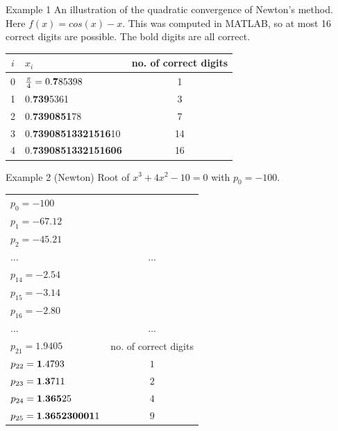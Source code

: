 \documentclass[12pt]{beamer}
\begin{document}
\begin{frame}{Example 1} 
An illustration of the quadratic convergence of Newton's method. Here $f(x) = cos(x) -x$. This was computed in MATLAB, so at most 16 correct digits are possible. The bold digits are all correct. 


\begin{table}[h] 
\begin{tabular}{c|l|c}
$i$ & $x_i$ & no. of correct digits \\ 
\hline
0   & $\frac{\pi}{4} = 0.{\bf 7}85398$ & 1 \\ 
1   & 0.{\bf 739}5361 & 3 \\ 
2   & 0.{\bf 7390851}78 & 7 \\ 
3   & 0.{\bf 73908513321516}10 & 14 \\ 
4   & 0.{\bf 7390851332151606}  & 16 \\ 
\end{tabular} 
\end{table} 

\end{frame} 

\begin{frame}{Example 2 (Newton)} 
Root of $x^3 + 4 x^2 -10 = 0$ with $p_0 = -100$. 

\begin{table}[h]
\begin{tabular}{l|c}
$p_0 = -100$ &  \\ 
$p_1 = -67.12$ &  \\ 
$p_2 = -45.21$ &  \\ 
$\dots$ & $\dots$ \\ 
$p_{14} = -2.54$ &  \\ 
$p_{15} = -3.14$ &  \\ 
$p_{16} = -2.80$ &  \\ 
$\dots$ & $\dots$ \\ 
$p_{21} = 1.9405$ &  no. of correct digits \\ 
$p_{22} = {\bf 1}.4793$ &  $1$ \\ 
$p_{23} = {\bf 1.3}711$ &  $2$ \\ 
$p_{24} = {\bf 1.365}25$ &  $4$ \\ 
$p_{25} = {\bf 1.365230001}1$  &  $9$ \\ 
\end{tabular} 
\end{table} 
\end{frame} 
\end{document}
